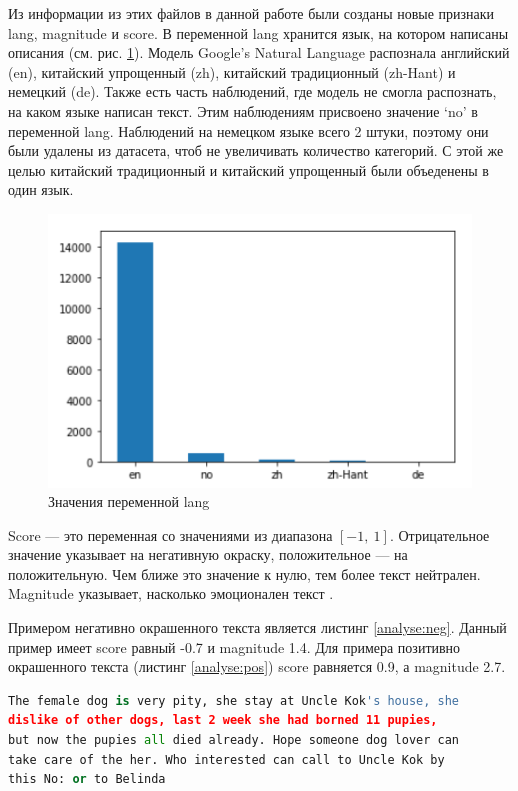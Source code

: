 \documentclass[14pt]{mmcs_article}
\begin{document}
Из информации из этих файлов в данной работе были созданы новые признаки lang, magnitude и score. В переменной lang хранится язык, на котором написаны описания (см. рис. \ref{analyse:lang}). Модель Google’s Natural Language распознала английский (en), китайский упрощенный (zh), китайский традиционный (zh-Hant) и немецкий (de). Также есть часть наблюдений, где модель не смогла распознать, на каком языке написан текст. Этим наблюдениям присвоено значение `no' в переменной lang. Наблюдений на немецком языке всего 2 штуки, поэтому они были удалены из датасета, чтоб не увеличивать количество категорий. С этой же целью китайский традиционный и китайский упрощенный были объеденены в один язык. 

\begin{figure}[H]
	\centering
	\includegraphics[scale=1.2]{lang.png}
	\caption{Значения переменной lang}\label{analyse:lang}
\end{figure}

Score --- это переменная со значениями из диапазона $[-1,\ 1]$. Отрицательное значение указывает на негативную окраску, положительное --- на положительную. Чем ближе это значение к нулю, тем более текст нейтрален. Magnitude указывает, насколько эмоционален текст \cite{lib:googlelang}.

Примером негативно окрашенного текста является листинг \ref{analyse:neg}. Данный пример имеет score равный -0.7 и magnitude 1.4. Для примера позитивно окрашенного текста (листинг \ref{analyse:pos}) score равняется 0.9, а magnitude 2.7. 

\begin{lstlisting}[language=Python, caption={Пример негативно окрашенного текста}, label=analyse:neg]
The female dog is very pity, she stay at Uncle Kok's house, she 
dislike of other dogs, last 2 week she had borned 11 pupies, 
but now the pupies all died already. Hope someone dog lover can 
take care of the her. Who interested can call to Uncle Kok by 
this No: or to Belinda
\end{lstlisting}
\end{document}
